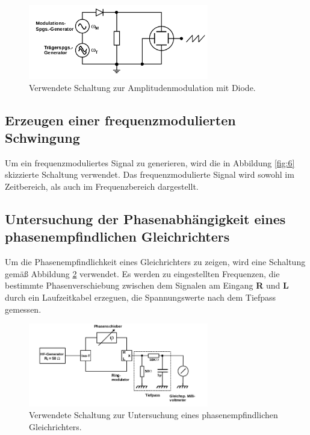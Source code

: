 \begin{figure}
  \centering
  \includegraphics[width=0.7\textwidth]{figures/c_d.png}
  \caption{Verwendete Schaltung zur Amplitudenmodulation mit Diode.\cite{sample}}
  \label{fig:14}
\end{figure}


\FloatBarrier
\subsection{Erzeugen einer frequenzmodulierten Schwingung}
\label{subsec:durchfuehrung_d}
Um ein frequenzmoduliertes Signal zu generieren, wird die in Abbildung
\ref{fig:6} skizzierte Schaltung verwendet.
Das frequenzmodulierte Signal wird sowohl im Zeitbereich, als auch
im Frequenzbereich dargestellt.


\FloatBarrier
\subsection{Untersuchung der Phasenabhängigkeit eines
phasenempfindlichen Gleichrichters}
\label{subsec:durchfuehrung_e}
Um die Phasenempfindlichkeit eines Gleichrichters zu zeigen,
wird eine Schaltung gemäß Abbildung \ref{fig:15} verwendet.
Es werden zu eingestellten Frequenzen, die bestimmte Phasenverschiebung zwischen
dem Signalen am Eingang \textbf{R} und \textbf{L} durch ein Laufzeitkabel erzeguen,
die Spannungswerte nach dem Tiefpass gemessen.

\begin{figure}
  \centering
  \includegraphics[width=0.7\textwidth]{figures/e_d.png}
  \caption{Verwendete Schaltung zur Untersuchung eines phasenempfindlichen Gleichrichters.\cite{sample}}
  \label{fig:15}
\end{figure}


